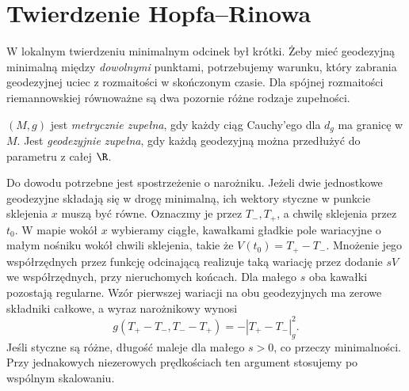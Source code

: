 \section{Twierdzenie Hopfa--Rinowa}
\label{sec:hopf-rinow}

W lokalnym twierdzeniu minimalnym odcinek był
krótki. Żeby mieć geodezyjną minimalną między \emph{dowolnymi}
punktami, potrzebujemy warunku, który zabrania
geodezyjnej uciec z rozmaitości w skończonym
czasie. Dla spójnej rozmaitości riemannowskiej
równoważne są dwa pozornie różne rodzaje
zupełności.

\begin{definicja}
\label{def:zupelnosc-geodezyjna}
$(M,g)$ jest \emph{metrycznie zupełna}, gdy
każdy ciąg Cauchy'ego dla $d_g$ ma granicę w $M$.
Jest \emph{geodezyjnie zupełna}, gdy każdą
geodezyjną można przedłużyć do parametru
z całej $\R$.
\end{definicja}

Do dowodu potrzebne jest spostrzeżenie o narożniku.
Jeżeli dwie jednostkowe geodezyjne składają się w drogę
minimalną, ich wektory styczne w punkcie sklejenia $x$
muszą być równe. Oznaczmy je przez $T_-,T_+$,
a chwilę sklejenia przez $t_0$.
W mapie wokół $x$ wybieramy ciągłe, kawałkami gładkie
pole wariacyjne o małym nośniku wokół chwili sklejenia,
takie że $V(t_0)=T_+-T_-$. Mnożenie jego współrzędnych
przez funkcję odcinającą realizuje taką wariację przez
dodanie $sV$ we współrzędnych, przy nieruchomych końcach.
Dla małego $s$ oba kawałki pozostają regularne.
Wzór pierwszej wariacji na obu geodezyjnych ma zerowe
składniki całkowe, a wyraz narożnikowy wynosi
\[
 g(T_+-T_-,T_--T_+)=-|T_+-T_-|_g^2.
\]
Jeśli styczne są różne, długość maleje dla małego $s>0$,
co przeczy minimalności. Przy jednakowych niezerowych
prędkościach ten argument stosujemy po wspólnym skalowaniu.

